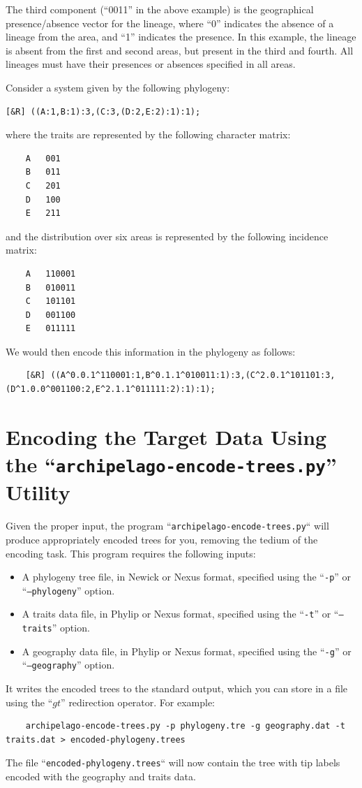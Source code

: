 \documentclass[11pt,openany]{memoir} %
\begin{document}
The third component (``0011'' in the above example) is the geographical presence/absence vector for the lineage, where ``0'' indicates the absence of a lineage from the area, and ``1'' indicates the presence.
In this example, the lineage is absent from the first and second areas, but present in the third and fourth. All lineages must have their presences or absences specified in all areas.

Consider a system given by the following phylogeny:
\begin{lstlisting}
[&R] ((A:1,B:1):3,(C:3,(D:2,E:2):1):1);
\end{lstlisting}
where the traits are represented by the following character matrix:
\begin{lstlisting}
    A   001
    B   011
    C   201
    D   100
    E   211
\end{lstlisting}
and the distribution over six areas is represented by the following incidence matrix:
\begin{lstlisting}
    A   110001
    B   010011
    C   101101
    D   001100
    E   011111
\end{lstlisting}
We would then encode this information in the phylogeny as follows:
\begin{lstlisting}
    [&R] ((A^0.0.1^110001:1,B^0.1.1^010011:1):3,(C^2.0.1^101101:3,(D^1.0.0^001100:2,E^2.1.1^011111:2):1):1);
\end{lstlisting}

\section{Encoding the Target Data Using the ``\texttt{archipelago-encode-trees.py}'' Utility}
\label{sec:workflow-encoding-the-target-data-using-the-archipelago-utility}

Given the proper input, the program ``\texttt{archipelago-encode-trees.py}`` will produce appropriately encoded trees for you, removing the tedium of the encoding task.
This program requires the following inputs:
\begin{itemize}
    \item A phylogeny tree file, in Newick or Nexus format, specified using the ``\texttt{-p}'' or ``\texttt{--phylogeny}'' option.
    \item A traits data file, in Phylip or Nexus format, specified using the ``\texttt{-t}'' or ``\texttt{--traits}'' option.
    \item A geography data file, in Phylip or Nexus format, specified using the ``\texttt{-g}'' or ``\texttt{--geography}'' option.
\end{itemize}
It writes the encoded trees to the standard output, which you can store in a file using the ``$gt$'' redirection operator.
For example:
\begin{lstlisting}
    archipelago-encode-trees.py -p phylogeny.tre -g geography.dat -t traits.dat > encoded-phylogeny.trees
\end{lstlisting}
The file ``\texttt{encoded-phylogeny.trees}`` will now contain the tree with tip labels encoded with the geography and traits data.
\end{document}
